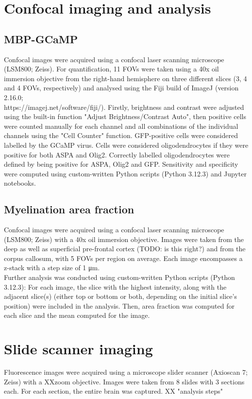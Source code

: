 \section{Confocal imaging and analysis}
\subsection{MBP-GCaMP}
Confocal images were acquired using a confocal laser scanning microscope (LSM800; Zeiss).
For quantification, 11 FOVs were taken using a 40x oil immersion objective from the right-hand hemisphere on three different slices (3, 4 and 4 FOVs, respectively) and analysed using the Fiji build of ImageJ (version 2.16.0;\\ https://imagej.net/software/fiji/). Firstly, brightness and contrast were adjusted using the built-in function "Adjust Brightness/Contrast Auto", then positive cells were counted manually for each channel and all combinations of the individual channels using the "Cell Counter" function.
GFP-positive cells were considered labelled by the GCaMP virus. Cells were considered oligodendrocytes if they were positive for both ASPA and Olig2. Correctly labelled oligodendrocytes were defined by being positive for ASPA, Olig2 and GFP. Sensitivity and specificity were computed using custom-written Python scripts (Python 3.12.3) and Jupyter notebooks.
\subsection{Myelination area fraction}
Confocal images were acquired using a confocal laser scanning microscope (LSM800; Zeiss) with a 40x oil immersion objective. Images were taken from the deep as well as superficial pre-frontal cortex (TODO: is this right?) and from the corpus callosum, with 5 FOVs per region on average. Each image encompasses a z-stack with a step size of 1 μm.\\
Further analysis was conducted using custom-written Python scripts (Python 3.12.3):
For each image, the slice with the highest intensity, along with the adjacent slice(s) (either top or bottom or both, depending on the initial slice's position) were included in the analysis. Then, area fraction was computed for each slice and the mean computed for the image.
\section{Slide scanner imaging}
Fluorescence images were acquired using a microscope slider scanner (Axioscan 7; Zeiss) with a XXzoom objective. Images were taken from 8 slides with 3 sections each. For each section, the entire brain was captured.
XX "analysis steps"
